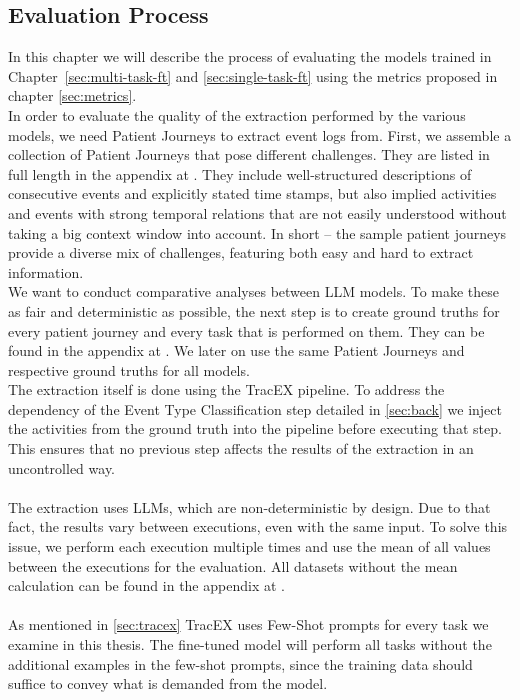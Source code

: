 \subsection{Evaluation Process}\label{sec:eval_process}
In this chapter we will describe the process of evaluating the models trained in Chapter~\ref{sec:multi-task-ft} and \ref{sec:single-task-ft} using the metrics proposed in chapter \ref{sec:metrics}.\\
In order to evaluate the quality of the extraction performed by the various models, we need Patient Journeys to extract event logs from. First, we assemble a collection of Patient Journeys that pose different challenges. They are listed in full length in the appendix at . They include well-structured descriptions of consecutive events and explicitly stated time stamps, but also implied activities and events with strong temporal relations that are not easily understood without taking a big context window into account. In short – the sample patient journeys provide a diverse mix of challenges, featuring both easy and hard to extract information.\\
We want to conduct comparative analyses between LLM models. To make these as fair and deterministic as possible, the next step is to create ground truths for every patient journey and every task that is performed on them. They can be found in the appendix at . We later on use the same Patient Journeys and respective ground truths for all models.\\
The extraction itself is done using the TracEX pipeline. To address the dependency of the Event Type Classification step detailed in \autoref{sec:back} we inject the activities from the ground truth into the pipeline before executing that step. This ensures that no previous step affects the results of the extraction in an uncontrolled way.\\\\
The extraction uses LLMs, which are non-deterministic by design. Due to that fact, the results vary between executions, even with the same input. To solve this issue, we perform each execution multiple times and use the mean of all values between the executions for the evaluation. All datasets without the mean calculation can be found in the appendix at .\\\\
As mentioned in \autoref{sec:tracex} TracEX uses Few-Shot prompts for every task we examine in this thesis. The fine-tuned model will perform all tasks without the additional examples in the few-shot prompts, since the training data should suffice to convey what is demanded from the model.

